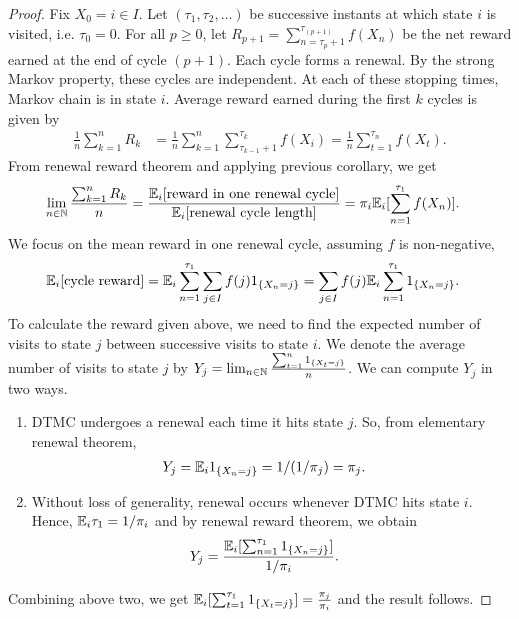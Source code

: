 \documentclass[a4paper,10pt,english]{article}
\begin{document}
\begin{proof}

Fix $X_0 = i \in I$. Let $(\tau_1, \tau_2, \ldots)$ be successive instants at which state $i$ is visited, i.e. $\tau_0 = 0$. 
For all $p \geq 0$,  let $R_{p+1} = \sum_{n = \tau_p + 1}^{\tau_{(p + 1)}} f(X_n)$ be the net reward earned at the end of cycle $(p+1)$. 
Each cycle forms a renewal. 
By the strong Markov property, these cycles are independent. 
At each of these stopping times, Markov chain is in state $i$. 
Average reward earned during the first $k$ cycles is given by
\begin{align*}	
\frac{1}{n} \sum_{k=1}^{n} R_k &= \frac{1}{n} \sum_{k=1}^{n} \sum_{\tau_{k-1} + 1}^{\tau_k} f(X_i)= \frac{1}{n} \sum_{t=1}^{\tau_n} f(X_t).
\end{align*}
From renewal reward theorem and applying previous corollary, we get
\begin{align*}
\lim_{n \in \mathbb{N}}\frac{\sum_{k=1}^nR_k}{n} &= \frac{\mathbb{E}_i[\text{reward in one renewal cycle}]}{\mathbb{E}_i[\text{renewal cycle length}]} = \pi_i\mathbb{E}_i[\sum_{n=1}^{\tau_1}f(X_n)].
\end{align*}
We focus on the mean reward in one renewal cycle, assuming $f$ is non-negative,
\begin{align*}
\mathbb{E}_i[\text{cycle reward}] &= \mathbb{E}_i\sum_{n=1}^{\tau_1} \sum_{j \in I} f(j) 1_{\{X_n = j\}} = \sum_{j \in I} f(j) \mathbb{E}_i\sum_{n=1}^{\tau_1} 1_{\{X_n = j\}}.
\end{align*}
To calculate the reward given above, we need to find the expected number of visits to state $j$ between successive visits to state $i$. 
We denote the average number of visits to state $j$ by  
$Y_j = \lim_{n \in \mathbb{N}}\frac{\sum_{t=1}^{n} 1_{\{X_t = j\}}}{n}$. %
We can compute $Y_j$ in two ways.
\begin{enumerate}
	\item DTMC undergoes a renewal each time it hits state $j$. 
	So, from elementary renewal theorem, 
	\begin{align*}
	Y_j &= \mathbb{E}_i1_{\{X_n = j\}} = 1/(1/\pi_j) = \pi_j.
	\end{align*}
	\item Without loss of generality, renewal occurs whenever DTMC hits state $i$. Hence, $\mathbb{E}_i\tau_1 = 1/\pi_i$ and by renewal reward theorem, we obtain
	\begin{align*}
	Y_j &= \frac{\mathbb{E}_i[\sum_{n=1}^{\tau_1} 1_{\{X_n = j\}}]}{1/\pi_i}.
	\end{align*}
\end{enumerate}
Combining above two, we get $\mathbb{E}_i[\sum_{t=1}^{\tau_1} 1_{\{X_t = j\}}] = \frac{\pi_j}{\pi_i}$ and the result follows. 
\end{proof}
\end{document}

